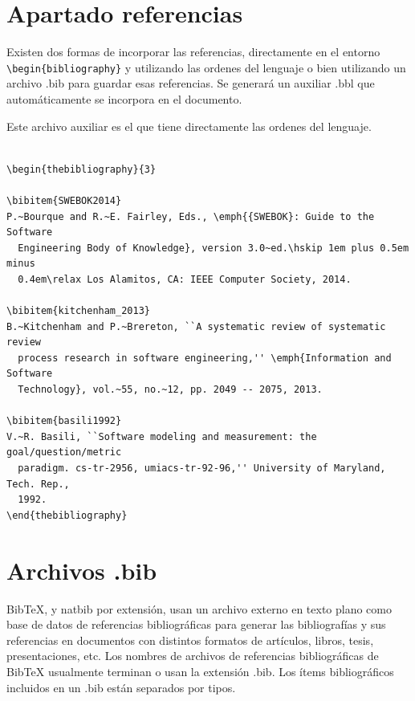  \section {Apartado referencias}
  Existen dos formas de incorporar las referencias, directamente en el entorno   \lstinline[language=enparrafo]!\begin{bibliography}! y utilizando las ordenes del lenguaje o bien utilizando un archivo .bib para guardar esas referencias. Se generará un auxiliar .bbl que automáticamente se incorpora en el documento.
  
  Este archivo auxiliar es el que tiene directamente las ordenes del lenguaje.
  
 \begin{verbatim}
  
\begin{thebibliography}{3}

\bibitem{SWEBOK2014}
P.~Bourque and R.~E. Fairley, Eds., \emph{{SWEBOK}: Guide to the Software
  Engineering Body of Knowledge}, version 3.0~ed.\hskip 1em plus 0.5em minus
  0.4em\relax Los Alamitos, CA: IEEE Computer Society, 2014.

\bibitem{kitchenham_2013}
B.~Kitchenham and P.~Brereton, ``A systematic review of systematic review
  process research in software engineering,'' \emph{Information and Software
  Technology}, vol.~55, no.~12, pp. 2049 -- 2075, 2013.

\bibitem{basili1992}
V.~R. Basili, ``Software modeling and measurement: the goal/question/metric
  paradigm. cs-tr-2956, umiacs-tr-92-96,'' University of Maryland, Tech. Rep.,
  1992.
\end{thebibliography}

  \end{verbatim}
 
 
 
 \section{Archivos .bib}
 
 BibTeX, y natbib por extensión, usan un archivo externo en texto plano como base de datos de referencias bibliográficas para generar las bibliografías y sus referencias en documentos con distintos formatos de artículos, libros, tesis, presentaciones, etc. Los nombres de archivos de referencias bibliográficas de BibTeX usualmente terminan o usan la extensión .bib. Los ítems bibliográficos incluidos en un .bib están separados por tipos.
 

